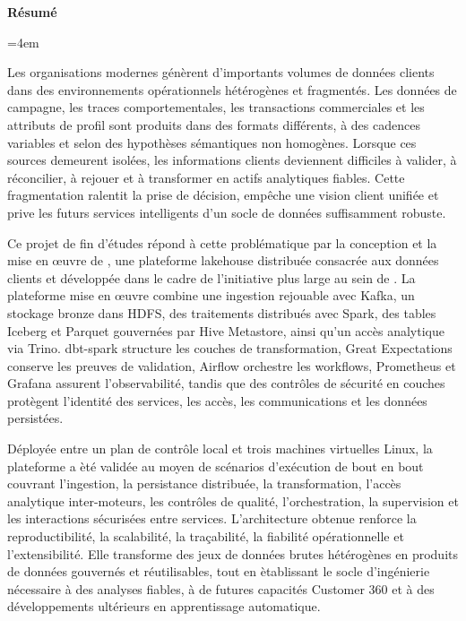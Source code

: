 \clearpage
{}
{}
\thispagestyle{plain}
\vspace*{-0.55cm}
{\Huge\bfseries R\'esum\'e\par}
\vspace{0.65cm}

\begingroup
\emergencystretch=4em

Les organisations modernes g\'en\`erent d'importants volumes de donn\'ees clients dans des environnements op\'erationnels h\'et\'erog\`enes et fragment\'es. Les donn\'ees de campagne, les traces comportementales, les transactions commerciales et les attributs de profil sont produits dans des formats diff\'erents, \`a des cadences variables et selon des hypoth\`eses s\'emantiques non homog\`enes. Lorsque ces sources demeurent isol\'ees, les informations clients deviennent difficiles \`a valider, \`a r\'econcilier, \`a rejouer et \`a transformer en actifs analytiques fiables. Cette fragmentation ralentit la prise de d\'ecision, emp\^eche une vision client unifi\'ee et prive les futurs services intelligents d'un socle de donn\'ees suffisamment robuste.

Ce projet de fin d'\'etudes r\'epond \`a cette probl\'ematique par la conception et la mise en \oe{}uvre de \projectname{}, une plateforme lakehouse distribu\'ee consacr\'ee aux donn\'ees clients et d\'evelopp\'ee dans le cadre de l'initiative plus large \initiative{} au sein de \companyname. La plateforme mise en \oe{}uvre combine une ingestion rejouable avec Kafka, un stockage bronze dans HDFS, des traitements distribu\'es avec Spark, des tables Iceberg et Parquet gouvern\'ees par Hive Metastore, ainsi qu'un acc\`es analytique via Trino. dbt-spark structure les couches de transformation, Great Expectations conserve les preuves de validation, Airflow orchestre les workflows, Prometheus et Grafana assurent l'observabilit\'e, tandis que des contr\^oles de s\'ecurit\'e en couches prot\`egent l'identit\'e des services, les acc\`es, les communications et les donn\'ees persist\'ees.

D\'eploy\'ee entre un plan de contr\^ole local et trois machines virtuelles Linux, la plateforme a \`et\'e valid\'ee au moyen de sc\'enarios d'ex\'ecution de bout en bout couvrant l'ingestion, la persistance distribu\'ee, la transformation, l'acc\`es analytique inter-moteurs, les contr\^oles de qualit\'e, l'orchestration, la supervision et les interactions s\'ecuris\'ees entre services. L'architecture obtenue renforce la reproductibilit\'e, la scalabilit\'e, la tra\c{c}abilit\'e, la fiabilit\'e op\'erationnelle et l'extensibilit\'e. Elle transforme des jeux de donn\'ees brutes h\'et\'erog\`enes en produits de donn\'ees gouvern\'es et r\'eutilisables, tout en \`etablissant le socle d'ing\'enierie n\'ecessaire \`a des analyses fiables, \`a de futures capacit\'es Customer 360 et \`a des d\'eveloppements ult\'erieurs en apprentissage automatique.


